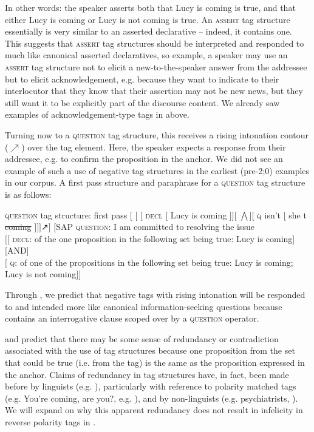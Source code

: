 \documentclass[output=paper,colorlinks,citecolor=brown]{langscibook}
\begin{document}
In other words: the speaker asserts both that Lucy is coming is true, and that either Lucy is coming or Lucy is not coming is true. An \textsc{assert} tag structure essentially is very similar to an asserted declarative -- indeed, it contains one. This suggests that \textsc{assert} tag structures should be interpreted and responded to much like canonical asserted declaratives, so example, a speaker may use an \textsc{assert} tag structure not to elicit a new-to-the-speaker answer from the addressee but to elicit acknowledgement, e.g. because they want to indicate to their interlocutor that they know that their assertion may not be new news, but they still want it to be explicitly part of the discourse content. We already saw examples of acknowledgement-type tags in  above.

Turning now to a \textsc{question} tag structure, this receives a rising intonation contour ($\nearrow$) over the tag element. Here, the speaker expects a response from their addressee, e.g. to confirm the proposition in the anchor. We did not see an example of such a use of negative tag structures in the earliest (pre-2;0) examples in our corpus. A first pass structure and paraphrase for a \textsc{question} tag structure is as follows:

\ea \textsc{question} tag structure: first pass\label{questiontag:pass1}
\ea	$[$ $[$ $[$ \textsc{decl} $[$ Lucy is coming $]] [$ $\bigwedge ] [$ \textsc{q} isn't $[$ she t \sout{coming} $]]]$↗$]$\label{questiontag1:b}
\ex	$[$SAP \textsc{question}: I am committed to resolving the issue\\ 
 \phantom{-SAP-}$[[$ \textsc{decl}: of the one proposition in the following set being true: Lucy is coming]\\
 \phantom{-SAP-}$[$AND$]$\\
 \phantom{-SAP-}$[$ \textsc{q}: of one of the propositions in the following set being true: Lucy is 
 	 	coming; Lucy is not coming$]]$
    \z\z

Through , we predict that negative tags with rising intonation will be responded to and intended more like canonical information-seeking questions because  contains an interrogative clause scoped over by a \textsc{question} operator.

 and  predict that there may be some sense of redundancy or contradiction associated with the use of tag structures because one proposition from the set that could be true (i.e. from the tag) is the same as the proposition expressed in the anchor. Claims of redundancy in tag structures have, in fact, been made before by linguists (e.g. \citealt{lakoffr1975}), particularly with reference to polarity matched tags (e.g. You're coming, are you?, e.g. \citealt{oconnor1955}), and by non-linguists (e.g. psychiatrists, \citealt{winefieldetal1989}). We will expand on why this apparent redundancy does not result in infelicity in reverse polarity tags in .
\end{document}
